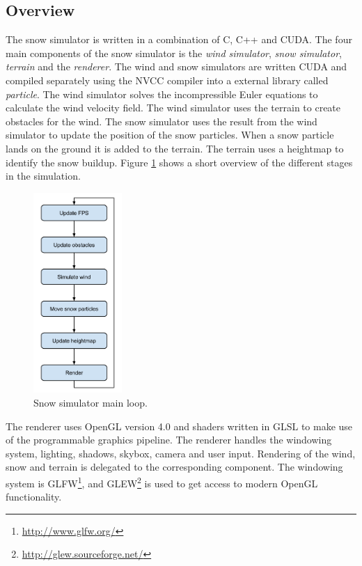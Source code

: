 \subsection{Overview}

The snow simulator is written in a combination of C, C++ and CUDA.
The four main components of the snow simulator is the \emph{wind simulator}, 
\emph{snow simulator}, \emph{terrain} and the \emph{renderer}. The wind and 
snow simulators are written CUDA and compiled separately using the NVCC compiler 
into a external library called \emph{particle}. The wind simulator 
solves the incompressible Euler equations to calculate the wind velocity field. 
The wind simulator uses the terrain to create obstacles for the wind. The snow 
simulator uses the result from the wind simulator to update the position of the 
snow particles. When a snow particle lands on the ground it is added to the terrain.
The terrain uses a heightmap to identify the snow buildup. Figure \ref{fig:mainLoop} 
shows a short overview of the different stages in the simulation. 

\begin{figure}[ht]
	\center
	\includegraphics[width=0.30\textwidth]{images/snow_sim_main_loop}
	\caption{Snow simulator main loop.}
	\label{fig:mainLoop}
\end{figure}

The renderer uses OpenGL version 4.0 and shaders written in GLSL to make use of 
the programmable graphics pipeline. The renderer handles the windowing system, 
lighting, shadows, skybox, camera and user input. Rendering of the wind, snow and 
terrain is delegated to the corresponding component. The windowing system 
is GLFW\footnote{\url{http://www.glfw.org/}}, and GLEW\footnote{\url{http://glew.sourceforge.net/}} 
is used to get access to modern OpenGL functionality. 

